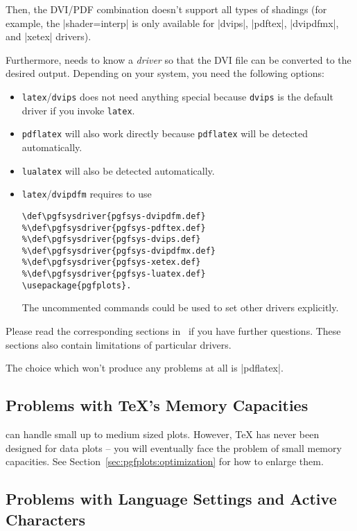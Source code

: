 Then, the DVI/PDF combination doesn't support all types of shadings (for
example, the |shader=interp| is only available for |dvips|, |pdftex|,
|dvipdfmx|, and |xetex| drivers).

Furthermore, \PGF{} needs to know a \emph{driver} so that the DVI file can be
converted to the desired output. Depending on your system, you need the
following options:
%
\begin{itemize}
    \item \lstinline!latex!/\lstinline!dvips! does not need anything special
        because \lstinline!dvips! is the default driver if you invoke
        \lstinline!latex!.
    \item \lstinline!pdflatex! will also work directly because
        \lstinline!pdflatex! will be detected automatically.
    \item \lstinline!lualatex! will also be detected automatically.
    \item \lstinline!latex!/\lstinline!dvipdfm! requires to use
\begin{verbatim}
\def\pgfsysdriver{pgfsys-dvipdfm.def}
%\def\pgfsysdriver{pgfsys-pdftex.def}
%\def\pgfsysdriver{pgfsys-dvips.def}
%\def\pgfsysdriver{pgfsys-dvipdfmx.def}
%\def\pgfsysdriver{pgfsys-xetex.def}
%\def\pgfsysdriver{pgfsys-luatex.def}
\usepackage{pgfplots}.
\end{verbatim}
        The uncommented commands could be used to set other drivers
        explicitly.
\end{itemize}
%
Please read the corresponding sections in~\cite[Sections~7.2.1 and 7.2.2]{tikz}
if you have further questions. These sections also contain limitations of
particular drivers.

The choice which won't produce any problems at all is |pdflatex|.


\subsection{Problems with \TeX's Memory Capacities}

\PGFPlots{} can handle small up to medium sized plots. However, \TeX{} has
never been designed for data plots -- you will eventually face the problem of
small memory capacities. See Section~\ref{sec:pgfplots:optimization} for how to
enlarge them.


\subsection{Problems with Language Settings and Active Characters}

